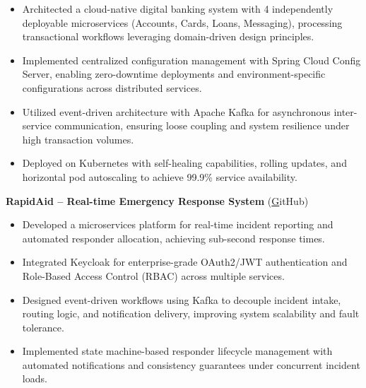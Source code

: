\documentclass[11pt]{article}
\begin{document}
\begin{itemize}


\item Architected a cloud-native digital banking system with 4 independently deployable microservices (Accounts, Cards, Loans, Messaging), processing transactional workflows leveraging domain-driven design principles.

\item Implemented centralized configuration management with Spring Cloud Config Server, enabling zero-downtime deployments and environment-specific configurations across distributed services.

\item Utilized event-driven architecture with Apache Kafka for asynchronous inter-service communication, ensuring loose coupling and system resilience under high transaction volumes.

\item Deployed on Kubernetes with self-healing capabilities, rolling updates, and horizontal pod autoscaling to achieve 99.9\% service availability.


\end{itemize}



\textbf{ RapidAid – Real-time Emergency Response System }
 (\href{https://GitHub}GitHub) 

\begin{itemize}


\item Developed a microservices platform for real-time incident reporting and automated responder allocation, achieving sub-second response times.

\item Integrated Keycloak for enterprise-grade OAuth2/JWT authentication and Role-Based Access Control (RBAC) across multiple services.

\item Designed event-driven workflows using Kafka to decouple incident intake, routing logic, and notification delivery, improving system scalability and fault tolerance.

\item Implemented state machine-based responder lifecycle management with automated notifications and consistency guarantees under concurrent incident loads.


\end{itemize}
\end{document}
